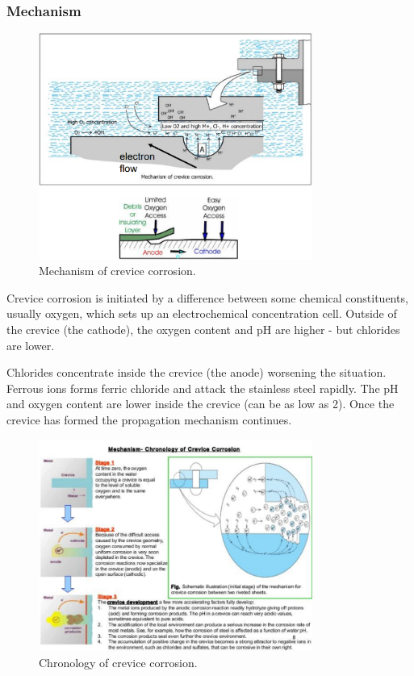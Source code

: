 \subsubsection{Mechanism}
\begin{figure}[H]
    \centering
    \includegraphics[width = 0.8\textwidth]{img/figure76.png}
    \caption{Mechanism of crevice corrosion.}
\end{figure}
Crevice corrosion is initiated by a difference between some chemical constituents, usually oxygen, which sets up an electrochemical concentration cell. Outside of the crevice (the cathode), the oxygen content and pH are higher - but chlorides are lower.

Chlorides concentrate inside the crevice (the anode) worsening the situation. Ferrous ions forms ferric chloride and attack the stainless steel rapidly. The pH and oxygen content are lower inside the crevice (can be as low as 2). Once the crevice has formed the propagation mechanism continues.
\begin{figure}[H]
    \centering
    \includegraphics[width = 0.8\textwidth]{img/figure77.png}
    \caption{Chronology of crevice corrosion.}
\end{figure}
